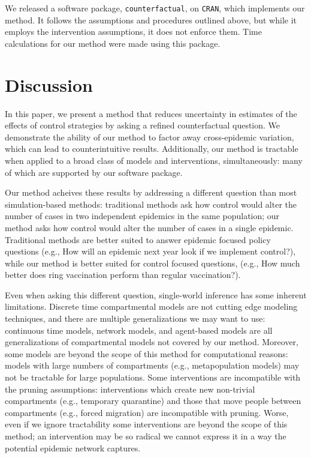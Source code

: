 \documentclass[PTRSB]{rsos}
\begin{document}
\begin{multicols}{2}
We released a software package, \texttt{counterfactual}, on \texttt{CRAN}, %
which implements our method.
It follows the assumptions and procedures outlined above, but while it employs the intervention assumptions, it does not enforce them.
Time calculations for our method were made using this package.

\section{Discussion}
In this paper, we present a method that reduces uncertainty in estimates of the effects of control strategies by asking a refined counterfactual question.
We demonstrate the ability of our method to factor away cross-epidemic variation, which can lead to counterintuitive results.
Additionally, our method is tractable when applied to a broad class of models and interventions, simultaneously: many of which are supported by our software package.

Our method acheives these results by addressing a different question than most simulation-based methods: traditional methods ask how control would alter the number of cases in two independent epidemics in the same population; our method asks how control would alter the number of cases in a single epidemic.
Traditional methods are better suited to answer epidemic focused policy questions (e.g., How will an epidemic next year look if we implement control?), while our method is better suited for control focused questions, (e.g., How much better does ring vaccination perform than regular vaccination?).

Even when asking this different question, single-world inference has some inherent limitations.
Discrete time compartmental models are not cutting edge modeling techniques, and there are multiple generalizations we may want to use: continuous time models, network models, and agent-based models are all generalizations of compartmental models not covered by our method.
Moreover, some models are beyond the scope of this method for computational reasons: models with large numbers of compartments (e.g., metapopulation models) may not be tractable for large populations.
Some interventions are incompatible with the pruning assumptions: interventions which create new non-trivial compartments (e.g., temporary quarantine) and those that move people between compartments (e.g., forced migration) are incompatible with pruning.
Worse, even if we ignore tractability some interventions are beyond the scope of this method; an intervention may be so radical we cannot express it in a way the potential epidemic network captures.


\end{multicols}
\end{document}

